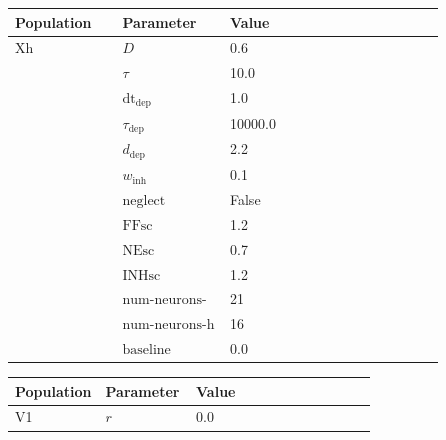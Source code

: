 \documentclass{article}
\begin{document}
\vspace{2ex}

\noindent
\begin{tabularx}{\linewidth}{|p{0.25\linewidth}|p{0.25\linewidth}|X|}\hline
\textbf{Population} & \textbf{Parameter} & \textbf{Value}   \\ \hline

    Xh             & $D$        & 0.6  \\ \hline

                 & $\tau$        & 10.0  \\ \hline

                 & ${\text{dt}}_{\text{dep}}$        & 1.0  \\ \hline

                 & $\tau_{\text{dep}}$        & 10000.0  \\ \hline

                 & $d_{\text{dep}}$        & 2.2  \\ \hline

                 & $w_{\text{inh}}$        & 0.1  \\ \hline

                 & ${\text{neglect}}$        & False  \\ \hline

                 & ${\text{FFsc}}$        & 1.2  \\ \hline

                 & ${\text{NEsc}}$        & 0.7  \\ \hline

                 & ${\text{INHsc}}$        & 1.2  \\ \hline

                 & ${\text{num-neurons-w}}$        & 21  \\ \hline

                 & ${\text{num-neurons-h}}$        & 16  \\ \hline

                 & ${\text{baseline}}$        & 0.0  \\ \hline

\end{tabularx}

\vspace{2ex}

\noindent
\begin{tabularx}{\linewidth}{|p{0.25\linewidth}|p{0.25\linewidth}|X|}\hline
\textbf{Population} & \textbf{Parameter} & \textbf{Value}   \\ \hline

    V1             & $r$        & 0.0  \\ \hline

\end{tabularx}
\end{document}
